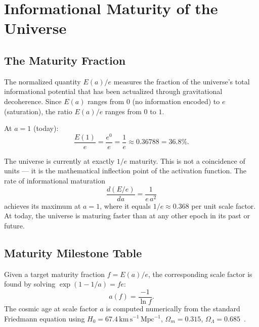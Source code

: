 \documentclass[12pt,letterpaper]{article}
\begin{document}
\section{Informational Maturity of the Universe}
\label{sec:maturity}

\subsection{The Maturity Fraction}

The normalized quantity $E(a)/e$ measures the fraction of the universe's total informational potential that has been actualized through gravitational decoherence. Since $E(a)$ ranges from $0$ (no information encoded) to $e$ (saturation), the ratio $E(a)/e$ ranges from $0$ to $1$.

At $a = 1$ (today):
\begin{equation}
    \frac{E(1)}{e} = \frac{e^0}{e} = \frac{1}{e} \approx 0.36788 = 36.8\%.
    \label{eq:maturity_today}
\end{equation}

The universe is currently at exactly $1/e$ maturity. This is not a coincidence of units --- it is the mathematical inflection point of the activation function. The rate of informational maturation
\begin{equation}
    \frac{d(E/e)}{da} = \frac{1}{e \, a^2}
    \label{eq:rate}
\end{equation}
achieves its maximum at $a = 1$, where it equals $1/e \approx 0.368$ per unit scale factor. At today, the universe is maturing faster than at any other epoch in its past or future.

\subsection{Maturity Milestone Table}

Given a target maturity fraction $f = E(a)/e$, the corresponding scale factor is found by solving $\exp(1 - 1/a) = fe$:
\begin{equation}
    a(f) = \frac{-1}{\ln f}.
    \label{eq:afraction}
\end{equation}
The cosmic age at scale factor $a$ is computed numerically from the standard Friedmann equation using $H_0 = 67.4\,\mathrm{km\,s^{-1}\,Mpc^{-1}}$, $\Omega_m = 0.315$, $\Omega_\Lambda = 0.685$~\citep{PlanckVI2020}.
\end{document}
